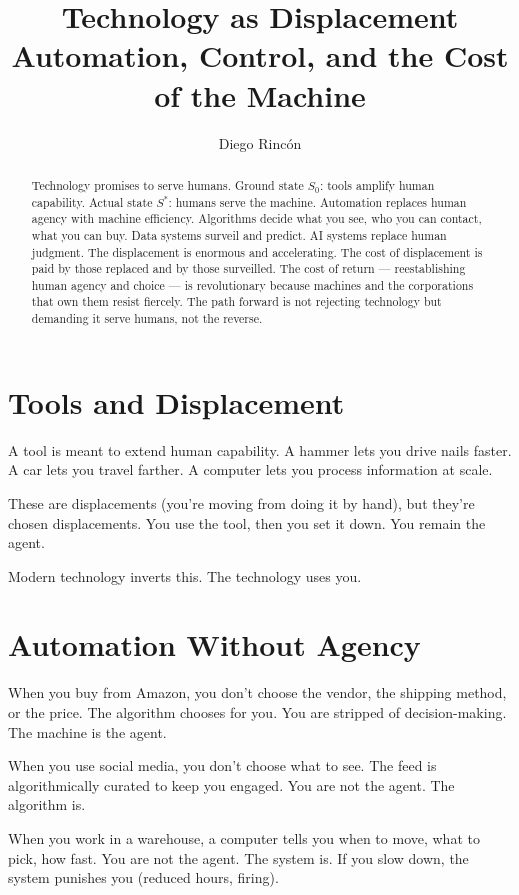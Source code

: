 \documentclass[12pt]{article}
\title{Technology as Displacement\\
Automation, Control, and the Cost of the Machine}
\author{Diego Rincón}
\date{}
\begin{document}
\maketitle

\begin{abstract}
Technology promises to serve humans. Ground state $S_0$: tools amplify human capability. Actual state $S^*$: humans serve the machine. Automation replaces human agency with machine efficiency. Algorithms decide what you see, who you can contact, what you can buy. Data systems surveil and predict. AI systems replace human judgment. The displacement is enormous and accelerating. The cost of displacement is paid by those replaced and by those surveilled. The cost of return — reestablishing human agency and choice — is revolutionary because machines and the corporations that own them resist fiercely. The path forward is not rejecting technology but demanding it serve humans, not the reverse.
\end{abstract}

\section{Tools and Displacement}

A tool is meant to extend human capability. A hammer lets you drive nails faster. A car lets you travel farther. A computer lets you process information at scale.

These are displacements (you're moving from doing it by hand), but they're chosen displacements. You use the tool, then you set it down. You remain the agent.

Modern technology inverts this. The technology uses you.

\section{Automation Without Agency}

When you buy from Amazon, you don't choose the vendor, the shipping method, or the price. The algorithm chooses for you. You are stripped of decision-making. The machine is the agent.

When you use social media, you don't choose what to see. The feed is algorithmically curated to keep you engaged. You are not the agent. The algorithm is.

When you work in a warehouse, a computer tells you when to move, what to pick, how fast. You are not the agent. The system is. If you slow down, the system punishes you (reduced hours, firing).
\end{document}
